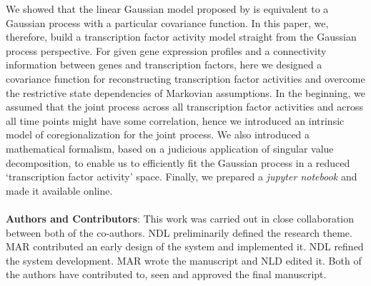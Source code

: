  We showed that the linear Gaussian model proposed by \cite{Sanguinetti:2006} is equivalent to a Gaussian process with a particular covariance function. In this paper, we, therefore, build a transcription factor activity model straight from the Gaussian process perspective. For given gene expression profiles and a connectivity information between genes and transcription factors, here we designed a covariance function for reconstructing transcription factor activities and overcome the restrictive state dependencies of Markovian assumptions. In the beginning, we assumed that the joint process across all transcription factor activities and across all time points might have some correlation, hence we introduced an intrinsic model of coregionalization for the joint process. We also introduced a mathematical formalism, based on a judicious application of singular value decomposition, to enable us to efficiently fit the Gaussian process in a reduced \lq transcription factor activity\rq{ }space. Finally, we prepared a \emph{jupyter notebook} and made it available online.\\ \ \\

\textbf{Authors and Contributors}: This work was carried out in close collaboration
between both of the co-authors. NDL preliminarily defined the research theme. MAR
contributed an early design of the system and implemented it. NDL
refined the system development. MAR wrote the manuscript and NLD edited it. Both of the authors have contributed to, seen and approved the final manuscript.



